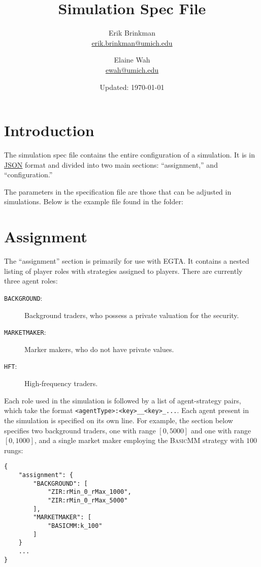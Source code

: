 \documentclass[11pt]{article}
\begin{document}
	
\title{Simulation Spec File}
\author{
  Erik Brinkman \\
  \href{mailto:erik.brinkman@umich.edu}{erik.brinkman@umich.edu}
  \and
  Elaine Wah \\
  \href{mailto:ewah@umich.edu}{ewah@umich.edu}
}
\date{Updated: \today}
\maketitle

\section{Introduction}

The simulation spec file contains the entire configuration of a simulation. It
is in \href{https://en.wikipedia.org/wiki/Json}{JSON} format and divided into
two main sections: ``assignment,'' and ``configuration.''

The parameters in the specification file are those that can be adjusted in
simulations. Below is the example  file found in
the  folder:



\section{Assignment}

The ``assignment'' section is primarily for use with EGTA. It contains a
nested listing of player roles with strategies assigned to players. 
%
There are currently three agent roles:
 \begin{description}
  \item[\texttt{BACKGROUND}:] Background traders, who possess a private valuation for the security.
  \item[\texttt{MARKETMAKER}:] Marker makers, who do not have private values.
  \item[\texttt{HFT}:] High-frequency traders.
  \end{description}

Each role used in the simulation is followed by a list of agent-strategy pairs, which take the format \texttt{<agentType>:<key>\_<value1>\_<key>\_<value2>...}. Each agent present in the simulation is specified on its own line.
%
For example, the section below specifies two background traders, one with range $[0, 5000]$ and one with range $[0, 1000]$, and a single market maker employing the \textsc{BasicMM} strategy with $100$ rungs:
%
\begin{lstlisting}
{
    "assignment": {
        "BACKGROUND": [
            "ZIR:rMin_0_rMax_1000",
            "ZIR:rMin_0_rMax_5000"
        ],
        "MARKETMAKER": [
            "BASICMM:k_100"
        ]
    }
    ...
}
\end{lstlisting}
\end{document}
